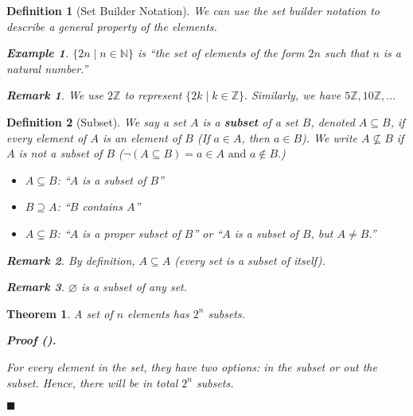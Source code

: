 \documentclass[12pt,a4paper]{article}
\newtheorem{thm}{Theorem}[subsection]
\newtheorem{df}{Definition}[subsection]
\newtheorem{eg}{Example}[subsection]
\newcounter{nprf}[subsection]
\newtheorem*{rmk}{\indent Remark}
\newenvironment*{prf}{\par\indent\textbf{\textit{Proof} (\stepcounter{nprf}\thenprf). }\par}{\par\hfill $\blacksquare$\par}
\def\Z{{\mathbb{Z}}}
\def\N{{\mathbb{N}}}
\def\emptyset{\varnothing}
\begin{document}
\begin{df}[Set Builder Notation]
	We can use the set builder notation to describe a general property of the elements.
	\begin{eg}
		$\{2n\mid n\in\N\}$ is ``the set of elements of the form $2n$ such that $n$ is a natural number.''	
	\end{eg}
	\begin{rmk} We use $2\Z$ to represent $\{2k\mid k\in\Z\}.$ Similarly, we have $5\Z, 10\Z,...$\end{rmk}
\end{df}
\begin{df}[Subset]
	We say a set $A$ is a \textbf{subset} of a set $B$, denoted $A\subseteq B$, if every element of $A$ is an element of $B$ (If $a\in A$, then $a\in B$). We write $A\nsubseteq B$ if $A$ is not a subset of $B$ ($\neg(A\subseteq B)=a\in A\text{ and }a\notin B.$)
	\begin{itemize}
		\item $A\subseteq B$: ``$A$ is a subset of $B$''
		\item $B\supseteq A$: ``$B$ contains $A$''
		\item $A\subsetneq B$: ``$A$ is a proper subset of $B$'' or ``$A$ is a subset of $B$, but $A\neq B$.''
	\end{itemize}
	\begin{rmk}By definition, $A\subseteq A$ (every set is a subset of itself). \end{rmk}
	\begin{rmk}$\emptyset$ is a subset of any set.\end{rmk}
\end{df}
\begin{thm}
	A set of $n$ elements has $2^n$ subsets.
	\begin{prf}
		For every element in the set, they have two options: in the subset or out the subset. Hence, there will be in total $2^n$ subsets.	
	\end{prf}
\end{thm}
\end{document}
